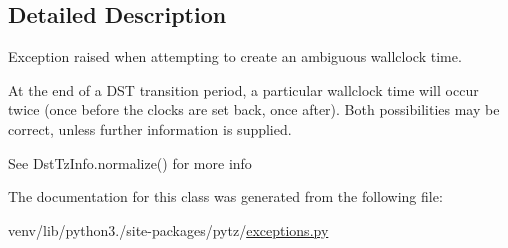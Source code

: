 \subsection{Detailed Description}
\begin{DoxyVerb}Exception raised when attempting to create an ambiguous wallclock time.

At the end of a DST transition period, a particular wallclock time will
occur twice (once before the clocks are set back, once after). Both
possibilities may be correct, unless further information is supplied.

See DstTzInfo.normalize() for more info
\end{DoxyVerb}
 

The documentation for this class was generated from the following file\+:\begin{DoxyCompactItemize}
\item 
venv/lib/python3./site-\/packages/pytz/\hyperlink{pytz_2exceptions_8py}{exceptions.\+py}\end{DoxyCompactItemize}
